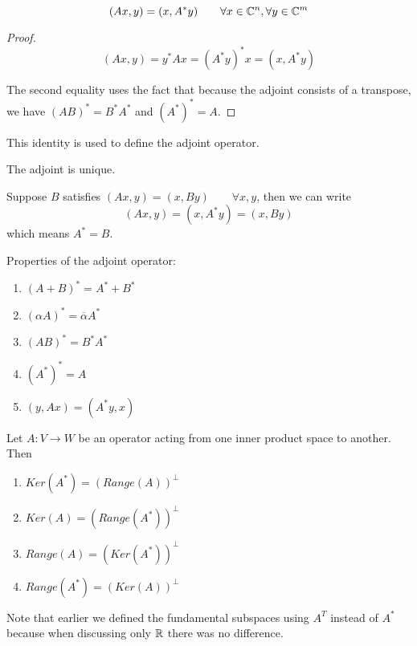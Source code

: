\begin{theorem}
$$(Ax, y) = (x, A^{*}y) \qquad \forall x \in \mathbb{C}^{n}, \forall y \in \mathbb{C}^{m}$$
\end{theorem}

\begin{proof}
$$(Ax, y) = y^{*} Ax = (A^{*} y)^{*} x = (x, A^{*} y)$$

The second equality uses the fact that because the adjoint consists of a transpose, we have $(AB)^{*} = B^{*} A^{*}$ and $(A^{*})^{*} = A$.  
\end{proof}

This identity is used to define the adjoint operator. 

\begin{lemma}
The adjoint is unique. 
\end{lemma}

\begin{lproof}
Suppose $B$ satisfies $(Ax, y) = (x, By) \qquad \forall x, y$, then we can write 
$$(Ax, y) = (x, A^{*} y) = (x, By)$$
which means $A^{*} = B$.
\end{lproof}

Properties of the adjoint operator:
\begin{enumerate}
	\item $(A + B)^{*} = A^{*} + B^{*}$ 
	\item $(\alpha A)^{*} = \overline{\alpha} A^{*}$ 
	\item $(AB)^{*} = B^{*} A^{*}$ 
	\item $(A^{*})^{*} = A$
	\item $(y, Ax) = (A^{*}y, x)$ 
\end{enumerate}

\begin{theorem}
Let $A: V \rightarrow W$ be an operator acting from one inner product space to another. Then 
\begin{enumerate}
	\item $Ker(A^{*}) = (Range(A))^{\perp}$ 
	\item $Ker(A) = (Range(A^{*}))^{\perp}$ 
	\item $Range(A) = (Ker(A^{*}))^{\perp}$ 
	\item $Range(A^{*}) = (Ker(A))^{\perp}$
\end{enumerate}

Note that earlier we defined the fundamental subspaces using $A^{T}$ instead of $A^{*}$ because when discussing only $\mathbb{R}$ there was no difference. 
\end{theorem}

